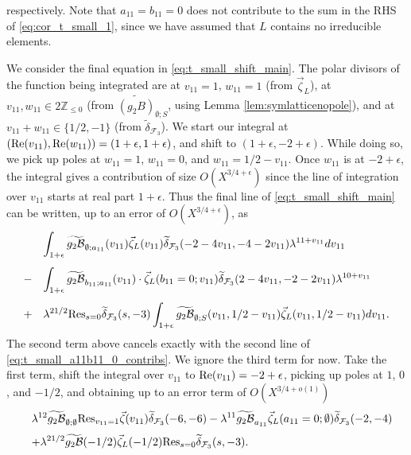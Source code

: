\documentclass{article}
\def\Z{{\mathbb Z}}
\def\Res{{\rm Res}}
\def\Re{{\rm Re}}
\def\cB{{\mathcal B}}
\def\FF{{\mathcal F}}
\def\Z{{\mathbb Z}}
\def\wt{\widetilde}
\begin{document}
respectively. Note that $a_{11}=b_{11}=0$ does not contribute to the sum in the RHS of \eqref{eq:cor_t_small_1}, since we have assumed that $L$ contains no irreducible elements.

We consider the final equation in \eqref{eq:t_small_shift_main}. The polar divisors of the function being integrated are at $v_{11}=1$, $w_{11}=1$ (from $\vec{\zeta}_L$), at $v_{11}, w_{11}\in2\Z_{\leq 0}$ (from $\widetilde{(g_2B)}_{\emptyset;S}$, using Lemma \ref{lem:symlatticenopole}), and at $v_{11}+w_{11}\in\{1/2,-1\}$ (from $\wt{\delta}_{\FF_3}$). We start our integral at $(\Re(v_{11}),\Re(w_{11}))=(1+\epsilon,1+\epsilon)$, and shift to $(1+\epsilon,-2+\epsilon)$. While doing so, we pick up poles at $w_{11}=1$, $w_{11}=0$, and $w_{11}=1/2-v_{11}$. Once $w_{11}$ is at $-2+\epsilon$, the integral gives a contribution of size $O(X^{3/4+\epsilon})$ since the line of integration over $v_{11}$ starts at real part $1+\epsilon$. Thus the final line of \eqref{eq:t_small_shift_main} can be written, up to an error of $O(X^{3/4+\epsilon})$, as
\begin{equation}\label{eq_t_small_temp1}
\begin{array}{ll}
&\displaystyle\int_{1+\epsilon}\wt{g_2\cB}_{\emptyset;a_{11}}(v_{11})\vec{\zeta}_L(v_{11})\wt{\delta}_{\FF_3}(-2-4v_{11},-4-2v_{11})\lambda^{11+v_{11}}dv_{11}
\\[.2in]
-&\displaystyle\int_{1+\epsilon}\widetilde{g_2\cB}_{b_{11};a_{11}}(v_{11})\cdot\vec{\zeta}_L(b_{11}=0;v_{11})\wt{\delta}_{\FF_3}(2-4v_{11},-2-2v_{11})\lambda^{10+v_{11}}
\\[.2in]
+&\displaystyle \lambda^{21/2}\Res_{s=0}\wt{\delta}_{\FF_3}(s,-3)\int_{1+\epsilon}\widetilde{g_2\cB}_{\emptyset;S}(v_{11},1/2-v_{11})\vec{\zeta}_L(v_{11},1/2-v_{11})dv_{11}.
\end{array}
\end{equation}
The second term above cancels exactly with the second line of \eqref{eq:t_small_a11b11_0_contribs}. We ignore the third term for now. Take the first term, shift the integral over $v_{11}$ to $\Re(v_{11})=-2+\epsilon$, picking up poles at $1$, $0$, and $-1/2$, and obtaining up to an error term of $O(X^{3/4+o(1)})$
\begin{equation}\label{eq_t_small_temp2}
\begin{array}{ll}
&\displaystyle\lambda^{12}\wt{g_2\cB}_{\emptyset;\emptyset}\Res_{v_{11}=1}\vec{\zeta}(v_{11})\wt{\delta}_{\FF_3}(-6,-6)-\lambda^{11}\wt{g_2\cB}_{a_{11}}\vec{\zeta}_L(a_{11}=0;\emptyset)\wt{\delta}_{\FF_3}(-2,-4)
\\[.1in]
&\displaystyle +\lambda^{21/2}\wt{g_2\cB}(-1/2)\vec{\zeta}_L(-1/2)\Res_{s=0}\wt{\delta}_{\FF_3}(s,-3).
\end{array}
\end{equation}
\end{document}
